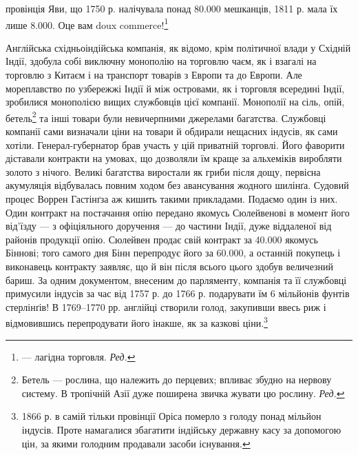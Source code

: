 \parcont{}  %
провінція Яви, що 1750 р. налічувала понад \num{80.000} мешканців,
1811 р. мала їх лише \num{8.000}. Оце вам doux commerce!\footnote*{
— лагідна торговля. \emph{Ред.}
}

Англійська східньоіндійська компанія, як відомо, крім політичної
влади у Східній Індії, здобула собі виключну монополію
на торговлю чаєм, як і взагалі на торговлю з Китаєм і на транспорт
товарів з Европи та до Европи. Але мореплавство по узбережжі
Індії й між островами, як і торговля всередині Індії,
зробилися монополією вищих службовців цієї компанії. Монополії
на сіль, опій, бетель\footnote*{
Бетель — рослина, що належить до перцевих; впливає збудно на
нервову систему. В тропічній Азії дуже поширена звичка жувати цю рослину.
\emph{Ред.}
} та інші товари були невичерпними
джерелами багатства. Службовці компанії сами визначали ціни
на товари й обдирали нещасних індусів, як сами хотіли. Генерал-губернатор
брав участь у цій приватній торговлі. Його фаворити
діставали контракти на умовах, що дозволяли їм краще за альхеміків
виробляти золото з нічого. Великі багатства виростали
як гриби після дощу, первісна акумуляція відбувалась повним
ходом без авансування жодного шилінґа. Судовий процес Воррен
Гастінґза аж кишить такими прикладами. Подаємо один із
них. Один контракт на постачання опію передано якомусь Сюлейвенові
в момент його від’їзду — з офіціяльного доручення —
до частини Індії, дуже віддаленої від районів продукції опію.
Сюлейвен продає свій контракт за \num{40.000} якомусь
Біннові; того самого дня Бінн перепродує його за \num{60.000}, а останній покупець і виконавець контракту заявляє,
що й він після всього цього здобув величезний бариш.
За одним документом, внесеним до парляменту, компанія та її
службовці примусили індусів за час від 1757 р. до 1766 р. подарувати
їм 6 мільйонів фунтів стерлінґів! В 1769--1770 рр.
англійці створили голод, закупивши ввесь риж і відмовившись
перепродувати його інакше, як за казкові ціни.\footnote{
1866 р. в самій тільки провінції Оріса померло з голоду понад
мільйон індусів. Проте намагалися збагатити індійську державну касу
за допомогою цін, за якими голодним продавали засоби існування.
}

